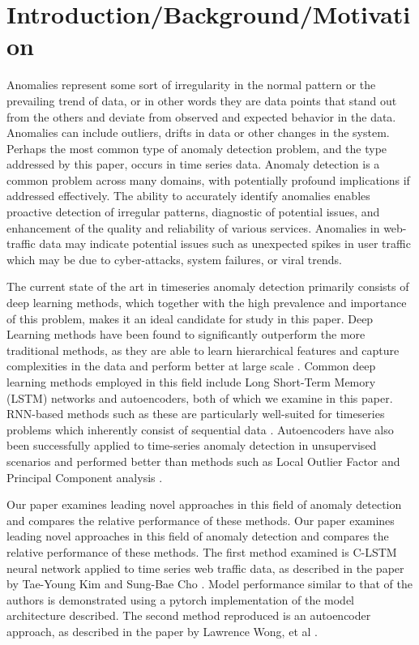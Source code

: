\documentclass[10pt,twocolumn,letterpaper]{article}
\begin{document}
\section{Introduction/Background/Motivation}

Anomalies represent some sort of irregularity in the normal pattern or the prevailing trend of data, or in other words they are data points that stand out from the others 
and deviate from observed and expected behavior in the data. Anomalies can include outliers, drifts in data or other changes in the system. Perhaps the most common type of 
anomaly detection problem, and the type addressed by this paper, occurs in time series data. Anomaly detection is a common problem across many domains, with potentially profound 
implications if addressed effectively. The ability to accurately identify anomalies enables proactive detection of irregular patterns, diagnostic of potential issues, and enhancement 
of the quality and reliability of various services. Anomalies in web-traffic data may indicate potential issues such as unexpected spikes in user traffic which may be due to 
cyber-attacks, system failures, or viral trends. 

The current state of the art in timeseries anomaly detection primarily consists of deep learning methods, which together with the high prevalence and importance of this problem, makes it an 
ideal candidate for study in this paper. Deep Learning methods have been found to significantly outperform the more traditional methods, as they are able to learn hierarchical features and capture 
complexities in the data and perform better at large scale \cite{chalapathy2019deep}. Common deep learning methods employed in this field include Long Short-Term Memory (LSTM) networks and autoencoders, both of which we 
examine in this paper. RNN-based methods such as these are particularly well-suited for timeseries problems which inherently consist of sequential data \cite{chalapathy2019deep}. Autoencoders have also been successfully 
applied to time-series anomaly detection in unsupervised scenarios and performed better than methods such as Local Outlier Factor and Principal Component analysis \cite{hagemann2020reconstruction}.

Our paper examines leading novel approaches in this field of anomaly detection and compares the relative performance of these methods. Our paper examines leading novel approaches in this field of anomaly detection and compares 
the relative performance of these methods. The first method examined is C-LSTM neural network applied to time series web traffic data, as described in the paper by Tae-Young Kim and Sung-Bae Cho \cite{kim2018web}. 
Model performance similar to that of the authors is demonstrated using a pytorch implementation of the model architecture described. The second method reproduced is an autoencoder approach, as
described in the paper by Lawrence Wong, et al \cite{wong2022aer}.
\end{document}

